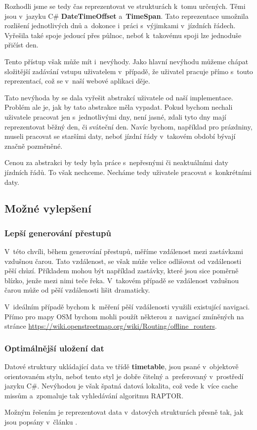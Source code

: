 Rozhodli jsme se tedy čas reprezentovat ve strukturách k~tomu určených. Těmi jsou v~jazyku C\# \textbf{DateTimeOffset} a~\textbf{TimeSpan}. Tato reprezentace umožnila rozlišení jednotlivých dnů a~dokonce i~práci s~výjimkami v~jízdních řádech. Vyřešila také spoje jedoucí přes půlnoc, neboť k~takovému spoji lze jednoduše přičíst den.


Tento přístup však může mít i~nevýhody. Jako hlavní nevýhodu můžeme chápat složitější zadávání vstupu uživatelem v~případě, že uživatel pracuje přímo s~touto reprezentací, což se v~naší webové aplikaci děje.

Tato nevýhoda by se dala vyřešit abstrakcí uživatele od naší implementace. Problém ale je, jak by tato abstrakce měla vypadat. Pokud bychom nechali uživatele pracovat jen s~jednotlivými dny, není jasné, zdali tyto dny mají reprezentovat běžný den, či sváteční den. Navíc bychom, například pro prázdniny, museli pracovat se staršími daty, neboť jízdní řády v~takovém období bývají značně pozměněné.

Cenou za abstrakci by tedy byla práce s~nepřesnými či neaktuálními daty jízdních řádů. To však nechceme. Necháme tedy uživatele pracovat s~konkrétními daty. 


\subsection{Možné vylepšení}

\subsubsection{Lepší generování přestupů}\label{optim-prestupy}

V~této chvíli, během generování přestupů, měříme vzdálenost mezi zastávkami vzdušnou čarou. Tato vzdálenost, se však může velice odlišovat od vzdálenosti pěší chůzí. Příkladem mohou být například zastávky, které jsou sice poměrně blízko, jenže mezi nimi teče řeka. V~takovém případě se vzdálenost vzdušnou čarou může od pěší vzdálenosti lišit dramaticky.

V~ideálním případě bychom k~měření pěší vzdálenosti využili existující navigaci. Přímo pro mapy OSM bychom mohli použít některou z~navigací zmíněných na stránce \url{https://wiki.openstreetmap.org/wiki/Routing/offline\_routers}.

\subsubsection{Optimálnější uložení dat}

Datové struktury ukládající data ve třídě \textbf{timetable}, jsou psané v~objektově orientovaném stylu, neboť tento styl je dobře čitelný a~preferovaný v~prostředí jazyku C\#. Nevýhodou je však špatná datová lokalita, což vede k~více cache missům a~zpomaluje tak vyhledávání algoritmu RAPTOR.

Možným řešením je reprezentovat data v~datových strukturách přesně tak, jak jsou popsány v~článku \citet[Appendix A]{raptor}.